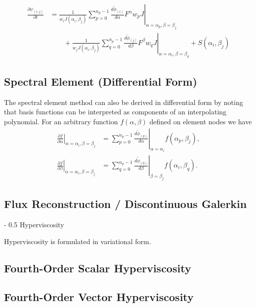 \documentclass{article}
\makeatletter
\renewcommand\section{\@startsection
  {section}{2}{0mm}%
  {-\baselineskip}%
  {0.5\baselineskip}%
  {\normalfont\Huge\bfseries}}%
\newcommand{\diff}[2]{\frac{d #1}{d #2}}
\newcommand{\pdiff}[2]{\frac{\partial #1}{\partial #2}}
\makeatother
\begin{document}
\begin{align}
\pdiff{\psi_{(i,j)}}{t} &= \frac{1}{w_i J(\alpha_i, \beta_j)} \sum_{p = 0}^{n_p-1} \left. \diff{\tilde{\phi}_{(i)}}{\alpha} F^\alpha w_p J \right\vert_{\alpha = \alpha_p, \beta = \beta_j} \nonumber \\
& \qquad + \frac{1}{w_j J(\alpha_i, \beta_j)} \sum_{q = 0}^{n_p-1} \left. \diff{\tilde{\phi}_{(j)}}{\beta} F^\beta w_q J \right\vert_{\alpha = \alpha_i, \beta = \beta_q} + S(\alpha_i, \beta_j)
\end{align}

\subsection{Spectral Element (Differential Form)}

The spectral element method can also be derived in differential form by noting that basis functions can be interpreted as components of an interpolating polynomial.  For an arbitrary function $f(\alpha, \beta)$ defined on element nodes we have
\begin{align}
\left. \pdiff{f}{\alpha} \right\vert_{\alpha = \alpha_i, \beta = \beta_j} &= \sum_{p=0}^{n_p-1} \left. \diff{\tilde{\phi}_{(p)}}{\alpha} \right\vert_{\alpha = \alpha_i} f(\alpha_p, \beta_j), \\
\left. \pdiff{f}{\beta} \right\vert_{\alpha = \alpha_i, \beta = \beta_j} &= \sum_{q=0}^{n_p-1} \left. \diff{\tilde{\phi}_{(q)}}{\beta} \right\vert_{\beta = \beta_j} f(\alpha_i, \beta_q).
\end{align}

\subsection{Flux Reconstruction / Discontinuous Galerkin}

\section{Hyperviscosity}

Hyperviscosity is formulated in variational form.

\subsection{Fourth-Order Scalar Hyperviscosity}

\subsection{Fourth-Order Vector Hyperviscosity}
\end{document}
